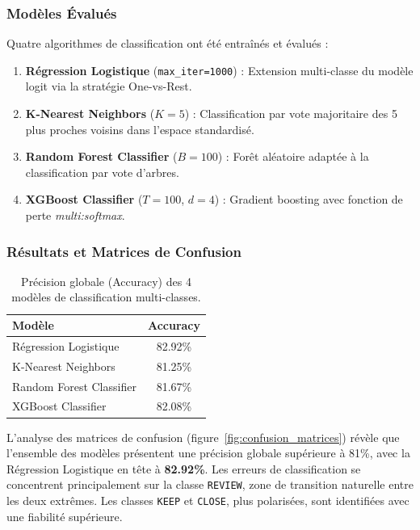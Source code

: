 \documentclass[11pt,a4paper,twoside]{report}
\begin{document}
\subsubsection{Modèles Évalués}

Quatre algorithmes de classification ont été entraînés et évalués :
\begin{enumerate}
    \item \textbf{Régression Logistique} \cite{hosmer2013} (\texttt{max\_iter=1000}) : Extension multi-classe du modèle logit via la stratégie One-vs-Rest.
    \item \textbf{K-Nearest Neighbors} \cite{cover1967} ($K=5$) : Classification par vote majoritaire des 5 plus proches voisins dans l'espace standardisé.
    \item \textbf{Random Forest Classifier} ($B=100$) : Forêt aléatoire adaptée à la classification par vote d'arbres.
    \item \textbf{XGBoost Classifier} ($T=100$, $d=4$) : Gradient boosting avec fonction de perte \textit{multi:softmax}.
\end{enumerate}

\subsubsection{Résultats et Matrices de Confusion}

\begin{table}[h]
\centering
\begin{tabular}{|l|c|}
\hline
\textbf{Modèle} & \textbf{Accuracy} \\ \hline
Régression Logistique & 82.92\% \\ \hline
K-Nearest Neighbors & 81.25\% \\ \hline
Random Forest Classifier & 81.67\% \\ \hline
XGBoost Classifier & 82.08\% \\ \hline
\end{tabular}
\caption{Précision globale (Accuracy) des 4 modèles de classification multi-classes.}
\label{tab:clf_benchmark}
\end{table}

L'analyse des matrices de confusion (figure~\ref{fig:confusion_matrices}) révèle que l'ensemble des modèles présentent une précision globale supérieure à 81\%, avec la Régression Logistique en tête à \textbf{82.92\%}. Les erreurs de classification se concentrent principalement sur la classe \texttt{REVIEW}, zone de transition naturelle entre les deux extrêmes. Les classes \texttt{KEEP} et \texttt{CLOSE}, plus polarisées, sont identifiées avec une fiabilité supérieure.
\end{document}
